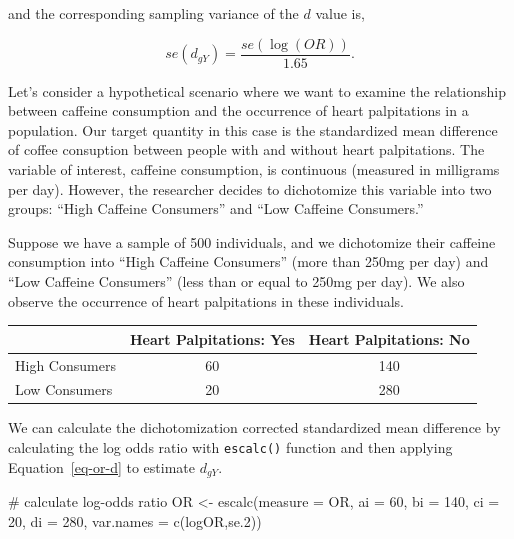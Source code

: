 \documentclass[
  letterpaper,
  DIV=11,
  numbers=noendperiod]{scrreprt}
\newenvironment{Shaded}{}{}
\newcommand{\AttributeTok}[1]{\textcolor[rgb]{0.00,0.34,0.68}{#1}}
\newcommand{\CommentTok}[1]{\textcolor[rgb]{0.54,0.53,0.53}{#1}}
\newcommand{\DecValTok}[1]{\textcolor[rgb]{0.69,0.50,0.00}{#1}}
\newcommand{\FunctionTok}[1]{\textcolor[rgb]{0.39,0.29,0.61}{#1}}
\newcommand{\NormalTok}[1]{\textcolor[rgb]{0.12,0.11,0.11}{#1}}
\newcommand{\OtherTok}[1]{\textcolor[rgb]{0.00,0.43,0.16}{#1}}
\newcommand{\StringTok}[1]{\textcolor[rgb]{0.75,0.01,0.01}{#1}}
\begin{document}
and the corresponding sampling variance of the \(d\) value is,

\[
se(d_{gY}) = \frac{se(\log(OR))}{1.65}.
\]

\begin{tcolorbox}[enhanced jigsaw, toptitle=1mm, titlerule=0mm, arc=.35mm, breakable, colframe=quarto-callout-note-color-frame, title={Applied Example in R}, opacitybacktitle=0.6, opacityback=0, colbacktitle=quarto-callout-note-color!10!white, coltitle=black, bottomtitle=1mm, colback=white, bottomrule=.15mm, rightrule=.15mm, toprule=.15mm, leftrule=.75mm, left=2mm]

Let's consider a hypothetical scenario where we want to examine the
relationship between caffeine consumption and the occurrence of heart
palpitations in a population. Our target quantity in this case is the
standardized mean difference of coffee consuption between people with
and without heart palpitations. The variable of interest, caffeine
consumption, is continuous (measured in milligrams per day). However,
the researcher decides to dichotomize this variable into two groups:
``High Caffeine Consumers'' and ``Low Caffeine Consumers.''

Suppose we have a sample of 500 individuals, and we dichotomize their
caffeine consumption into ``High Caffeine Consumers'' (more than 250mg
per day) and ``Low Caffeine Consumers'' (less than or equal to 250mg per
day). We also observe the occurrence of heart palpitations in these
individuals.

\begin{longtable}[]{@{}lcc@{}}
\toprule\noalign{}
& Heart Palpitations: Yes & Heart Palpitations: No \\
\midrule\noalign{}
\endhead
\bottomrule\noalign{}
\endlastfoot
High Consumers & 60 & 140 \\
Low Consumers & 20 & 280 \\
\end{longtable}

We can calculate the dichotomization corrected standardized mean
difference by calculating the log odds ratio with \texttt{escalc()}
function and then applying Equation~\ref{eq-or-d} to estimate
\(d_{gY}\).

\begin{Shaded}
\begin{Highlighting}[]
\CommentTok{\# calculate log{-}odds ratio}
\NormalTok{OR }\OtherTok{\textless{}{-}} \FunctionTok{escalc}\NormalTok{(}\AttributeTok{measure =} \StringTok{\textquotesingle{}OR\textquotesingle{}}\NormalTok{,}
             \AttributeTok{ai =} \DecValTok{60}\NormalTok{,}
             \AttributeTok{bi =} \DecValTok{140}\NormalTok{,}
             \AttributeTok{ci =} \DecValTok{20}\NormalTok{,}
             \AttributeTok{di =} \DecValTok{280}\NormalTok{,}
             \AttributeTok{var.names =} \FunctionTok{c}\NormalTok{(}\StringTok{\textquotesingle{}logOR\textquotesingle{}}\NormalTok{,}\StringTok{\textquotesingle{}se.2\textquotesingle{}}\NormalTok{))  }


\end{Highlighting}
\end{Shaded}
\end{tcolorbox}
\end{document}

